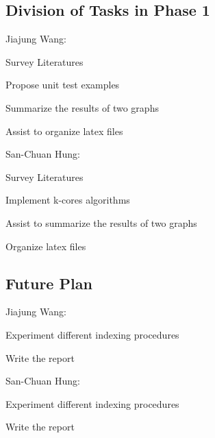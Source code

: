 \subsection{Division of Tasks in Phase 1}

\begin{itemize*}
\item
Jiajung Wang: 

\begin{itemize*}
\item
Survey Literatures
\item
Propose unit test examples
\item
Summarize the results of two graphs
\item
Assist to organize latex files
\end{itemize*}

\item
San-Chuan Hung: 

\begin{itemize*}
\item 
Survey Literatures
\item 
Implement k-cores algorithms
\item 
Assist to summarize the results of two graphs
\item
Organize latex files
\end{itemize*}
\end{itemize*}

\subsection{Future Plan}

\begin{itemize*}
\item
Jiajung Wang: 

\begin{itemize*}
\item
Experiment different indexing procedures
\item
Write the report
\end{itemize*}

\item
San-Chuan Hung: 

\begin{itemize*}
\item
Experiment different indexing procedures
\item
Write the report
\end{itemize*}
\end{itemize*}
